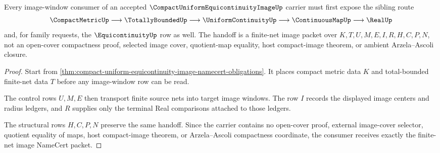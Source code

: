 \begin{theorem}
\label{thm:compact-uniform-equicontinuity-image-finite-net-handoff}
Every image-window consumer of an accepted $\CompactUniformEquicontinuityImageUp$ carrier must first expose the sibling route
$$
\CompactMetricUp \longrightarrow \TotallyBoundedUp \longrightarrow \UniformContinuityUp \longrightarrow \ContinuousMapUp \longrightarrow \RealUp
$$
and, for family requests, the $\EquicontinuityUp$ row as well. The handoff is a finite-net image packet over $K,T,U,M,E,I,R,H,C,P,N$, not an open-cover compactness proof, selected image cover, quotient-map equality, host compact-image theorem, or ambient Arzela--Ascoli closure.
\end{theorem}
\begin{proof}
Start from \autoref{thm:compact-uniform-equicontinuity-image-namecert-obligations}. It places compact metric data $K$ and total-bounded finite-net data $T$ before any image-window row can be read.

The control rows $U,M,E$ then transport finite source nets into target image windows. The row $I$ records the displayed image centers and radius ledgers, and $R$ supplies only the terminal Real comparisons attached to those ledgers.

The structural rows $H,C,P,N$ preserve the same handoff. Since the carrier contains no open-cover proof, external image-cover selector, quotient equality of maps, host compact-image theorem, or Arzela--Ascoli compactness coordinate, the consumer receives exactly the finite-net image NameCert packet.
\end{proof}



